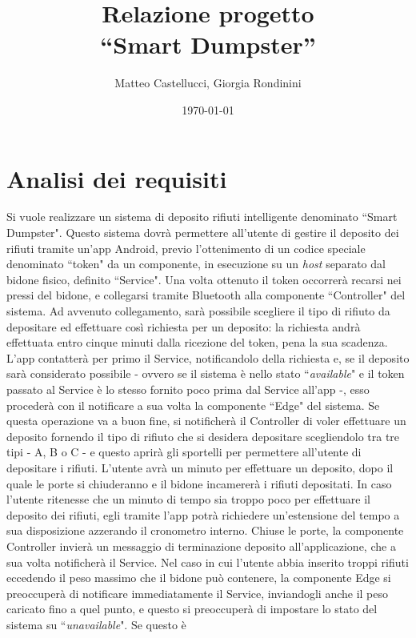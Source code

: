 \documentclass[a4paper, 12pt]{report}
\title{Relazione progetto\\``Smart Dumpster''}
\author{Matteo Castellucci, Giorgia Rondinini}
\date{\today}
\begin{document}
	\maketitle
	\tableofcontents
	\chapter{Analisi dei requisiti}
	Si vuole realizzare un sistema di deposito rifiuti intelligente denominato ``Smart Dumpster".\newline
	Questo sistema dovrà permettere all'utente di gestire il deposito dei rifiuti tramite un'app Android,
	previo l'ottenimento di un codice speciale denominato ``token" da un componente, in esecuzione su un
	\textit{host} separato dal bidone fisico, definito ``Service". Una volta ottenuto il token occorrerà
	recarsi nei pressi del bidone, e collegarsi tramite Bluetooth alla componente ``Controller" del
	sistema. Ad avvenuto collegamento, sarà possibile scegliere il tipo di rifiuto da depositare ed
	effettuare così richiesta per un deposito: la richiesta andrà effettuata entro cinque minuti dalla ricezione 
	del token, pena la sua scadenza. L'app contatterà per primo il Service, notificandolo della
	richiesta e, se il deposito sarà considerato possibile - ovvero se il sistema è nello stato ``\textit{available}"
	e il token passato al Service è lo stesso fornito poco prima dal Service all'app -, esso procederà
	con il notificare a sua volta la componente ``Edge" del sistema. Se questa operazione va a buon fine, 
	si notificherà il Controller di voler effettuare un deposito fornendo il tipo di rifiuto che si
	desidera depositare scegliendolo tra tre tipi - A, B o C - e questo aprirà gli sportelli per permettere
	all'utente di depositare i rifiuti. L'utente
	avrà un minuto per effettuare un deposito, dopo il quale le porte si chiuderanno e il bidone
	incamererà i rifiuti depositati. In caso l'utente ritenesse che un minuto di tempo sia troppo poco
	per effettuare il deposito dei rifiuti, egli tramite l'app potrà richiedere un'estensione del tempo a
	sua disposizione azzerando il cronometro interno. Chiuse le porte, la componente Controller invierà un messaggio di
	terminazione deposito all'applicazione, che a sua volta notificherà il Service. Nel caso in cui
	l'utente abbia inserito troppi rifiuti eccedendo il peso massimo che il bidone può contenere, la
	componente Edge si preoccuperà di notificare immediatamente il Service, inviandogli anche il peso caricato fino a
	quel punto, e questo si preoccuperà di impostare lo stato del sistema su ``\textit{unavailable}". Se questo è
\end{document}
